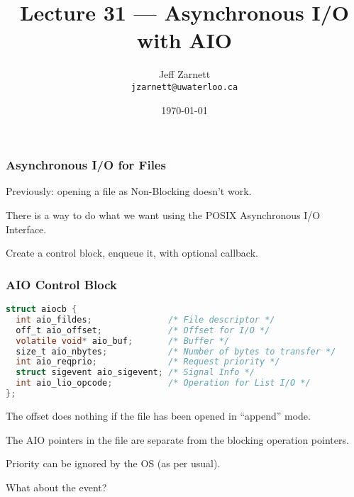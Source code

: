 

\title{Lecture 31 --- Asynchronous I/O with AIO }

\author{Jeff Zarnett \\ \small \texttt{jzarnett@uwaterloo.ca}}
\date{\today}




\begin{frame}
	\titlepage

\end{frame}



\begin{frame}
	\frametitle{Asynchronous I/O for Files}

	Previously: opening a file as Non-Blocking doesn't work.

	There is a way to do what we want using the POSIX Asynchronous I/O Interface.

	Create a control block, enqueue it, with optional callback.

\end{frame}


\begin{frame}[fragile]
	\frametitle{AIO Control Block}

	\begin{lstlisting}[language=C]
struct aiocb {
  int aio_fildes;               /* File descriptor */
  off_t aio_offset;             /* Offset for I/O */
  volatile void* aio_buf;       /* Buffer */
  size_t aio_nbytes;            /* Number of bytes to transfer */
  int aio_reqprio;              /* Request priority */
  struct sigevent aio_sigevent; /* Signal Info */
  int aio_lio_opcode;           /* Operation for List I/O */
};
\end{lstlisting}

	The offset does nothing if the file has been opened in ``append'' mode.

	The AIO pointers in the file are separate from the blocking operation pointers.

	Priority can be ignored by the OS (as per usual).

	What about the event?

\end{frame}


